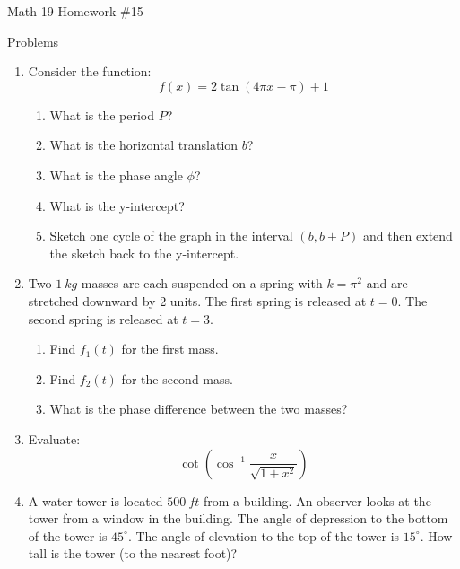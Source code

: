 \documentclass[letterpaper,12pt,fleqn]{article}
\begin{document}
\begin{center}
\Large Math-19 Homework \#15
\end{center}

\vspace{0.5in}

\underline{Problems}

\begin{enumerate}

\item Consider the function:
  \[f(x)=2\tan(4\pi x-\pi)+1\]
  \begin{enumerate}
  \item What is the period $P$?
  \item What is the horizontal translation $b$?
  \item What is the phase angle $\phi$?
  \item What is the y-intercept?
  \item Sketch one cycle of the graph in the interval $(b,b+P)$ and then extend
    the sketch back to the y-intercept.
  \end{enumerate}

\item Two $\SI{1}{kg}$ masses are each suspended on a spring with $k=\pi^2$ and
  are stretched downward by 2 units. The first spring is released at $t=0$. The
  second spring is released at $t=3$.
  \begin{enumerate}
  \item Find $f_1(t)$ for the first mass.
  \item Find $f_2(t)$ for the second mass.
  \item What is the phase difference between the two masses?
  \end{enumerate}

\item Evaluate:
  \[\cot\left(\cos^{-1}\frac{x}{\sqrt{1+x^2}}\right)\]

\item A water tower is located $\SI{500}{ft}$ from a building. An observer
  looks at the tower from a window in the building. The angle of depression
  to the bottom of the tower is $45^{\circ}$. The angle of elevation to the
  top of the tower is $15^{\circ}$. How tall is the tower (to the nearest foot)?
\end{enumerate}
 
\end{document}
